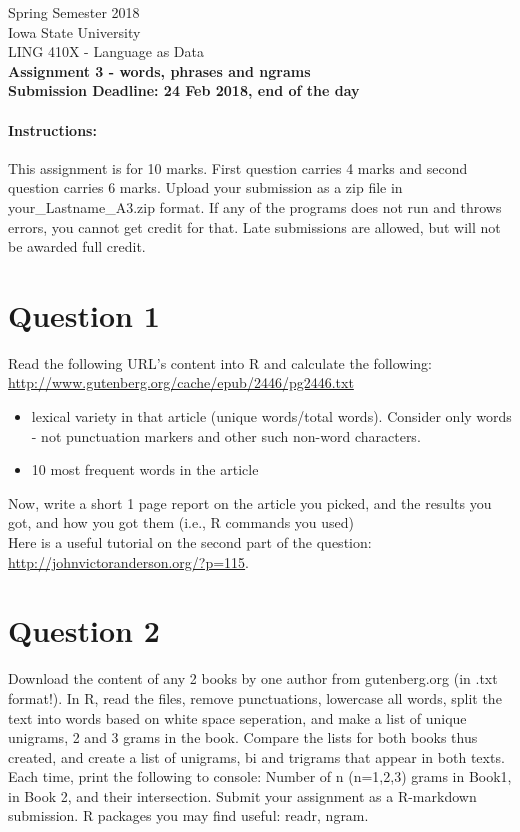 \documentclass[11pt,a4paper]{article}
\begin{document}
\begin{center}
  Spring Semester 2018 \\ Iowa State University\\[3ex]
  {\large LING 410X - Language as Data}\\[3ex]
  \textbf{Assignment 3 - words, phrases and ngrams} \\ \textbf{Submission Deadline: 24 Feb 2018, end of the day}
\end{center}


\paragraph{Instructions:} This assignment is for 10 marks. First question carries 4 marks and second question carries 6 marks. Upload your submission as a zip file in your\_Lastname\_A3.zip format. If any of the programs does not run and throws errors, you cannot get credit for that. Late submissions are allowed, but will not be awarded full credit.

\section*{Question 1}
Read the following URL's content into R and calculate the following:
\url{http://www.gutenberg.org/cache/epub/2446/pg2446.txt}
\begin{itemize}
\item lexical variety in that article (unique words/total words). Consider only words - not punctuation markers and other such non-word characters.
\item 10 most frequent words in the article
\end{itemize}
Now, write a short 1 page report on the article you picked, and the results you got, and how you got them (i.e., R commands you used)
\\ Here is a useful tutorial on the second part of the question: \url{http://johnvictoranderson.org/?p=115}.  

\section*{Question 2}
Download the content of any 2 books by one author from gutenberg.org (in .txt format!). In R, read the files, remove punctuations, lowercase all words, split the text into words based on white space seperation, and make a list of unique unigrams, 2 and 3 grams in the book. Compare the lists for both books thus created, and create a list of unigrams, bi and trigrams that appear in both texts. Each time, print the following to console: Number of n (n=1,2,3) grams in Book1, in Book 2, and their intersection. Submit your assignment as a R-markdown submission. R packages you may find useful: readr, ngram. 
\end{document}
